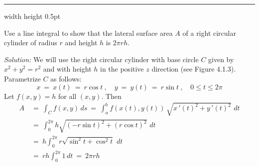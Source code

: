 \hrule width \textwidth height 0.5pt
\begin{exa}\label{exa:lineintcyl}
 Use a line integral to show that the lateral surface area $A$ of a right circular cylinder of radius $r$ and height $h$
 is $2\pi r h$.\vspace{1mm}
 \par\noindent \emph{Solution:} We will use the right circular cylinder with base
 circle $C$ given by $x^2 + y^2 = r^2$ and with height $h$ in the positive $z$ direction (see Figure 4.1.3).
 Parametrize $C$ as follows:
 \begin{displaymath}
  x ~=~ x(t) ~=~ r \cos t ~,\quad y ~=~ y(t) ~=~ r \sin t~,\quad 0 \le t \le 2\pi
 \end{displaymath}
 Let $f(x,y) = h$ for all $(x,y)$. Then
 \begin{align*}
  A ~&=~ \int_C f(x,y)\,ds ~=~ \int_a^b f(x(t),y(t)) \,\sqrt{x\,'(t)^2 + y\,'(t)^2}\,\,dt\\
   &=~ \int_0^{2\pi} h \sqrt{(-r \sin t)^2 + (r \cos t)^2}\,\,dt\\
   &=~ h\int_0^{2\pi} r \sqrt{\sin^2 t + \cos^2 t}\,\,dt\\
   &=~ rh\int_0^{2\pi} 1 \,dt ~=~ 2\pi r h
 \end{align*}
\end{exa}
